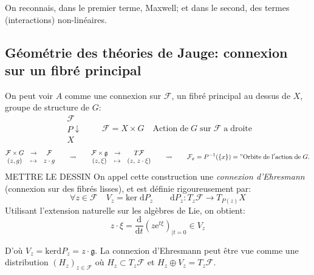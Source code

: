 \documentclass[a4paper,11pt]{article}
\renewcommand{\d}{{\mathrm{d}}}
\newcommand{\e}{{\mathrm{e}}}
\begin{document}
On reconnais, dans le premier terme, Maxwell; et dans le second, des termes (interactions) non-linéaires.

\subsection{Géométrie des théories de Jauge: connexion sur un fibré principal}
On peut voir $A$ comme une connexion sur $\mathcal{F}$, un fibré principal au dessus de $X$, groupe de structure de $G$:
$$\begin{matrix}
\mathcal{F}\\
P \downarrow \quad \\
X
\end{matrix}\quad \mathcal{F}=X\times G
\quad \mathrm{Action}\;\mathrm{de}\;G\;\mathrm{sur}\;\mathcal{F}\; \mathrm{a} \;\mathrm{droite}$$
$$\begin{matrix}
\mathcal{F}\times G & \to & \mathcal{F}\\
(z,g) & \mapsto & z \cdot g
\end{matrix}
\quad\quad \rightsquigarrow \quad\quad
\begin{matrix}
\mathcal{F}\times \mathfrak{g} & \to & T\mathcal{F}\\
(z,\xi) & \mapsto & (z,\,z \cdot \xi)
\end{matrix}
\quad\quad \rightsquigarrow \quad\quad
\mathcal{F}_x = P^{-1}(\{x\}) = "\mathrm{Orbite}\;\mathrm{de}\;\mathrm{l}'\mathrm{action}\;\mathrm{de}\; G.
$$
\color{red} METTRE LE DESSIN \color{black}
On appel cette construction une \emph{connexion d'Ehresmann} (connexion sur des fibrés lisses), et est définie rigoureusement par:
$$\forall z \in \mathcal{F} \quad V_z = \mathrm{ker} \; \d P_z \quad \quad \d P_z : T_z \mathcal{F} \to T_{P(z)} X$$
Utilisant l'extension naturelle sur les algèbres de Lie, on obtient:
$$z\cdot \xi = \frac{\d}{\d t}\left(z\e^{t\xi}\right)_{|t=0} \in V_z$$

D'où
$V_z = \mathrm{ker} \d P_z = z \cdot \mathfrak{g}$. 
La connexion d'Ehresmann peut être vue comme une distribution $(H_z)_{z\in\mathcal{F}}$ où $H_z \subset T_z \mathcal{F}$ et $H_z \oplus V_z = T_z \mathcal{F}$.
\end{document}
